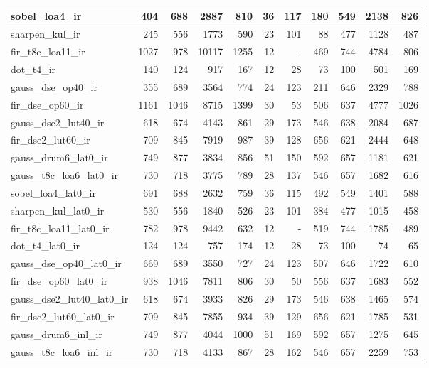 \begin{table}[htbp]
\begin{tabular}{|l|r|r|r|r|r|r|r|r|r|r|}
sobel\_loa4\_ir & 404 & 688 & 2887 & 810 & 36 & 117 & 180 & 549 & 2138 & 826 \\ \hline
sharpen\_kul\_ir & 245 & 556 & 1773 & 590 & 23 & 101 & 88 & 477 & 1128 & 487 \\ \hline
fir\_t8c\_loa11\_ir & 1027 & 978 & 10117 & 1255 & 12 & - & 469 & 744 & 4784 & 806 \\ \hline
dot\_t4\_ir & 140 & 124 & 917 & 167 & 12 & 28 & 73 & 100 & 501 & 169 \\ \hline
gauss\_dse\_op40\_ir & 355 & 689 & 3564 & 774 & 24 & 123 & 211 & 646 & 2329 & 788 \\ \hline
fir\_dse\_op60\_ir & 1161 & 1046 & 8715 & 1399 & 30 & 53 & 506 & 637 & 4777 & 1026 \\ \hline
gauss\_dse2\_lut40\_ir & 618 & 674 & 4143 & 861 & 29 & 173 & 546 & 638 & 2084 & 687 \\ \hline
fir\_dse2\_lut60\_ir & 709 & 845 & 7919 & 987 & 39 & 128 & 656 & 621 & 2444 & 648 \\ \hline
gauss\_drum6\_lat0\_ir & 749 & 877 & 3834 & 856 & 51 & 150 & 592 & 657 & 1181 & 621 \\ \hline
gauss\_t8c\_loa6\_lat0\_ir & 730 & 718 & 3775 & 789 & 28 & 137 & 546 & 657 & 1682 & 616 \\ \hline
sobel\_loa4\_lat0\_ir & 691 & 688 & 2632 & 759 & 36 & 115 & 492 & 549 & 1401 & 588 \\ \hline
sharpen\_kul\_lat0\_ir & 530 & 556 & 1840 & 526 & 23 & 101 & 384 & 477 & 1015 & 458 \\ \hline
fir\_t8c\_loa11\_lat0\_ir & 782 & 978 & 9442 & 632 & 12 & - & 519 & 744 & 1785 & 489 \\ \hline
dot\_t4\_lat0\_ir & 124 & 124 & 757 & 174 & 12 & 28 & 73 & 100 & 74 & 65 \\ \hline
gauss\_dse\_op40\_lat0\_ir & 669 & 689 & 3550 & 727 & 24 & 123 & 507 & 646 & 1722 & 610 \\ \hline
fir\_dse\_op60\_lat0\_ir & 938 & 1046 & 7811 & 806 & 30 & 50 & 556 & 637 & 1683 & 552 \\ \hline
gauss\_dse2\_lut40\_lat0\_ir & 618 & 674 & 3933 & 826 & 29 & 173 & 546 & 638 & 1465 & 574 \\ \hline
fir\_dse2\_lut60\_lat0\_ir & 709 & 845 & 7855 & 934 & 39 & 129 & 656 & 621 & 1785 & 531 \\ \hline
gauss\_drum6\_inl\_ir & 749 & 877 & 4044 & 1000 & 51 & 169 & 592 & 657 & 1275 & 645 \\ \hline
gauss\_t8c\_loa6\_inl\_ir & 730 & 718 & 4133 & 867 & 28 & 162 & 546 & 657 & 2259 & 753 \\ \hline

\end{tabular}
\end{table}

